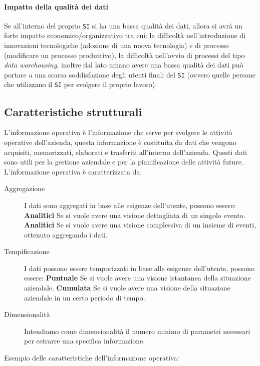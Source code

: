         \paragraph{Impatto della qualità dei dati}
            Se all'interno del proprio \texttt{SI} si ha una bassa qualità dei dati, allora si avrà un forte impatto economico/organizzativo tra cui: la difficoltà nell'introduzione di innovazioni tecnologiche (adozione di una nuova tecnologia) e di processo (modificare un processo produttivo), la difficoltà nell'avvio di processi del tipo \textit{data warehousing}, inoltre dal lato umano avere una bassa qualità dei dati può portare a una scarsa soddisfazione degli utenti finali del \texttt{SI} (ovvero quelle persone che utilizzano il \texttt{SI} per svolgere il proprio lavoro).
    \subsection{Caratteristiche strutturali}
        L'informazione operativa è l'informazione che serve per svolgere le attività operative dell'azienda, questa informazione è costituita da dati che vengono acquisiti, memorizzati, elaborati e trasferiti all'interno dell'azienda. Questi dati sono utili per la gestione aziendale e per la pianificazione delle attività future. L'informazione operativa è caratterizzata da:
        \begin{description}
            \item[Aggregazione] I dati sono aggregati in base alle esigenze dell'utente, possono essere:
                \subitem \textbf{Analitici} Se si vuole avere una visione dettagliata di un singolo evento.
                \subitem \textbf{Analitici} Se si vuole avere una visione complessiva di un insieme di eventi, ottenuto aggregando i dati.
            \item[Tempificazione] I dati possono essere temporizzati in base alle esigenze dell'utente, possono essere:
                \subitem \textbf{Puntuale} Se si vuole avere una visione istantanea della situazione aziendale.
                \subitem \textbf{Cumulata} Se si vuole avere una visione della situazione aziendale in un certo periodo di tempo.
            \item[Dimensionalità] Intendiamo come dimensionalità il numero minimo di parametri necessari per estrarre una specifica informazione.
        \end{description}
        Esempio delle caratteristiche dell'informazione operativa:
